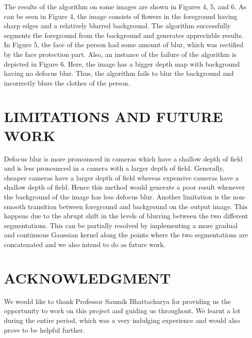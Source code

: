 \documentclass[letterpaper, 10 pt, conference]{ieeeconf}  %
\begin{document}
The results of the algorithm on some images are shown in Figures 4, 5, and 6. As can be seen in Figure 4, the image consists of flowers in the foreground having sharp edges and a relatively blurred background. The algorithm successfully segments the foreground from the background and generates appreciable results. In Figure 5, the face of the person had some amount of blur, which was rectified by the face protection part. Also, an instance of the failure of the algorithm is depicted in Figure 6. Here, the image has a bigger depth map with background having no defocus blur. Thus, the algorithm fails to blur the background and incorrectly blurs the clothes of the person.      



\section{LIMITATIONS AND FUTURE WORK}

Defocus blur is more pronounced in cameras which have a shallow depth of field and is less pronounced in a camera with a larger depth of field. Generally, cheaper cameras have a larger depth of field whereas expensive cameras have a shallow depth of field. Hence this method would generate a poor result whenever the background of the image has less defocus blur. Another limitation is the non-smooth transition between foreground and background on the output image. This happens due to the abrupt shift in the levels of blurring between the two different segmentations. This can be partially resolved by implementing a more gradual and continuous Gaussian kernel along the points where the two segmentations are concatenated and we also intend to do as future work.


\break
\break
\break
\break
\break
\section*{ACKNOWLEDGMENT}

We would like to thank Professor Saumik Bhattacharya for providing us the opportunity to work on this project and guiding us throughout. We learnt a lot during the entire period, which was a very indulging experience and would also prove to be helpful further.




\end{document}
